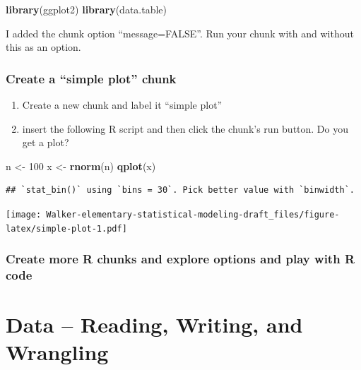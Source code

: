 \documentclass[]{book}
\newenvironment{Shaded}{\begin{snugshade}}{\end{snugshade}}
\newcommand{\KeywordTok}[1]{\textcolor[rgb]{0.13,0.29,0.53}{\textbf{#1}}}
\newcommand{\DecValTok}[1]{\textcolor[rgb]{0.00,0.00,0.81}{#1}}
\newcommand{\StringTok}[1]{\textcolor[rgb]{0.31,0.60,0.02}{#1}}
\newcommand{\NormalTok}[1]{#1}
\providecommand{\tightlist}{%
  \setlength{\itemsep}{0pt}\setlength{\parskip}{0pt}}
\begin{document}
\begin{Shaded}
\begin{Highlighting}[]
\KeywordTok{library}\NormalTok{(ggplot2)}
\KeywordTok{library}\NormalTok{(data.table)}
\end{Highlighting}
\end{Shaded}

I added the chunk option ``message=FALSE''. Run your chunk with and
without this as an option.

\subsection{\texorpdfstring{Create a ``simple plot''
chunk}{Create a simple plot chunk}}\label{create-a-simple-plot-chunk}

\begin{enumerate}
\def\labelenumi{\arabic{enumi}.}
\setcounter{enumi}{3}
\tightlist
\item
  Create a new chunk and label it ``simple plot''
\item
  insert the following R script and then click the chunk's run button.
  Do you get a plot?
\end{enumerate}

\begin{Shaded}
\begin{Highlighting}[]
\NormalTok{n <-}\StringTok{ }\DecValTok{100}
\NormalTok{x <-}\StringTok{ }\KeywordTok{rnorm}\NormalTok{(n)}
\KeywordTok{qplot}\NormalTok{(x)}
\end{Highlighting}
\end{Shaded}

\begin{verbatim}
## `stat_bin()` using `bins = 30`. Pick better value with `binwidth`.
\end{verbatim}

\texttt{[image: Walker-elementary-statistical-modeling-draft\_files/figure-latex/simple-plot-1.pdf]}

\subsection{Create more R chunks and explore options and play with R
code}\label{create-more-r-chunks-and-explore-options-and-play-with-r-code}

\chapter{Data -- Reading, Writing, and
Wrangling}\label{data-reading-writing-and-wrangling}
\end{document}

